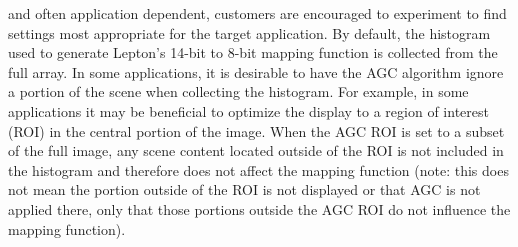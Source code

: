 and often application dependent, customers are encouraged to experiment to find
settings most appropriate for the target application. By default, the histogram
used to generate Lepton's 14-bit to 8-bit mapping function is collected from the
full array. In some applications, it is desirable to have the AGC algorithm
ignore a portion of the scene when collecting the histogram. For example, in
some applications it may be beneficial to optimize the display to a region of
interest (ROI) in the central portion of the image. When the AGC ROI is set to a
subset of the full image, any scene content located outside of the ROI is not
included in the histogram and therefore does not affect the mapping function
(note: this does not mean the portion outside of the ROI is not displayed or
that AGC is not applied there, only that those portions outside the AGC ROI do
not influence the mapping function).\cite{flirdatasheet}
